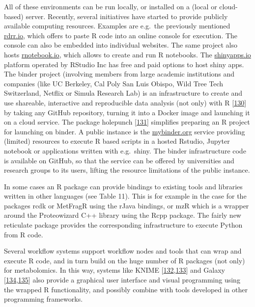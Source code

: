 \documentclass[]{article}
\begin{document}
All of these environments can be run locally, or installed on a (local or cloud-based) server. Recently, several initiatives have started to provide publicly available computing resources. Examples are e.g.~the previously mentioned \href{https://rdrr.io/}{rdrr.io}, which offers to paste R code into an online console for execution. The console can also be embedded into individual websites. The same project also hosts \href{https://rnotebook.io/}{rnotebook.io}, which allows to create and run R notebooks. The \href{https://shinyapps.io/}{shinyapps.io} platform operated by RStudio Inc has free and paid options to host shiny apps. The binder project (involving members from large academic institutions and companies (like UC Berkeley, Cal Poly San Luis Obispo, Wild Tree Tech Switzerland, Netflix or Simula Research Lab) is an infrastructure to create and use shareable, interactive and reproducible data analysis (not only) with R {[}\protect\hyperlink{ref-jupyter_2018}{130}{]} by taking any GitHub repository, turning it into a Docker image and launching it on a cloud service. The package holepunch {[}\protect\hyperlink{ref-ram_website_nd}{131}{]} simplifies preparing an R project for launching on binder. A public instance is the \href{https://mybinder.org/}{mybinder.org} service providing (limited) resources to execute R based scripts in a hosted Rstudio, Jupyter notebook or applications written with e.g.~shiny. The binder infrastructure code is available on GitHub, so that the service can be offered by universities and research groups to its users, lifting the resource limitations of the public instance.

In some cases an R package can provide bindings to existing tools and libraries written in other languages (see Table 11). This is for example in the case for the packages rcdk or MetFragR using the rJava bindings, or mzR which is a wrapper around the Proteowizard C++ library using the Rcpp package. The fairly new reticulate package provides the corresponding infrastructure to execute Python from R code.

Several workflow systems support workflow nodes and tools that can wrap and execute R code, and in turn build on the huge number of R packages (not only) for metabolomics. In this way, systems like KNIME {[}\protect\hyperlink{ref-liggi_2018}{132},\protect\hyperlink{ref-verhoeven_2018}{133}{]} and Galaxy {[}\protect\hyperlink{ref-davidson_2016}{134},\protect\hyperlink{ref-giacomoni_2015}{135}{]} also provide a graphical user interface and visual programming using the wrapped R functionality, and possibly combine with tools developed in other programming frameworks.
\end{document}
